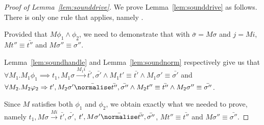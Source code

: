 \begin{proof}[Proof of Lemma~\ref{lem:sounddrive}]
  We prove Lemma~\ref{lem:sounddrive} as follows.
  There is only one rule that applies, namely .

  Provided that $M\phi_1\land\phi_2$, we need to demonstrate that  with $\bar{\sigma}=M\sigma$ and $j=M i$,
  $M t'' \equiv \bar{t''}$ and $M\sigma''\equiv \bar{\sigma''}$.


  Lemma~\ref{lem:soundhandle} and Lemma~\ref{lem:soundnorm} respectively give us that\\
$\forall M_1 . M_1 \phi_1 \implies t_1,M_1\sigma \xrightarrow[]{M_1 i} \bar{t'},\bar{\sigma'}\land M_1 t'\equiv\bar{t'}\land M_1\sigma' \equiv \bar{\sigma'}$ and \\
$\forall M_2 . M_2 \phi_2 \implies t',M_2\sigma' \bar{\normalise} \bar{t''},\bar{\sigma''}\land M_2 t''\equiv\bar{t''}\land M_2\sigma'' \equiv \bar{\sigma''}$.

Since $M$ satisfies both $\phi_1$ and $\phi_2$,
we obtain exactly what we needed to prove,
namely
$t_1,M\sigma \xrightarrow[]{M i} \bar{t'},\bar{\sigma'}$,
$t',M\sigma' \bar{\normalise} \bar{t''},\bar{\sigma''}$,
$M t'' \equiv \bar{t''}$ and $M\sigma''\equiv \bar{\sigma''}$.

\end{proof}
